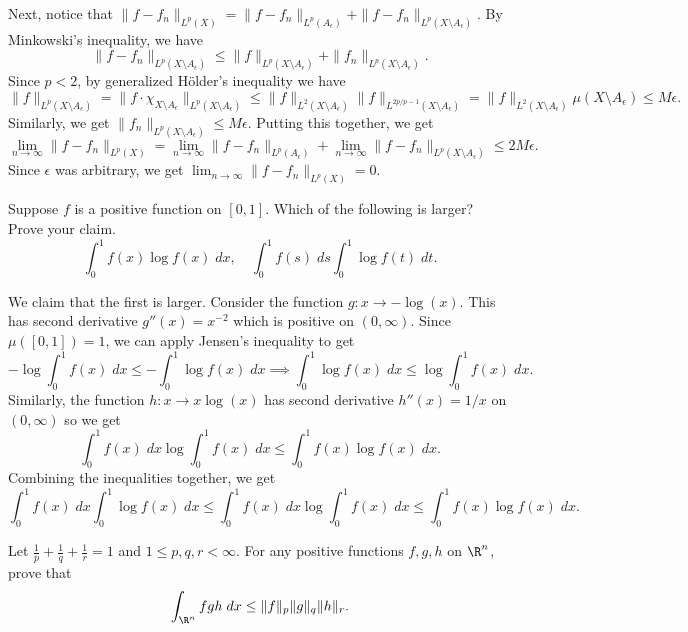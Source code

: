 \documentclass[11pt,letterpaper]{article}
\begin{document}
\begin{solution}
    \quad Next, notice that $\|f-f_n\|_{L^p(X)} = \|f-f_n\|_{L^p(A_\epsilon)} + \|f-f_n\|_{L^p(X\setminus A_\epsilon)}$. By Minkowski's inequality, we have
    \[
        \|f-f_n\|_{L^p(X\setminus A_\epsilon)} \leq \|f\|_{L^p(X\setminus A_\epsilon)}+\|f_n\|_{L^p(X\setminus A_\epsilon)}
    .\] 
    Since $p<2$, by generalized H\"older's inequality we have
    \[
        \|f\|_{L^p(X\setminus A_\epsilon)} = \|f\cdot \chi_{X\setminus A_\epsilon}\|_{L^p(X\setminus A_\epsilon)} \leq \|f\|_{L^2(X\setminus A_\epsilon)}\|f\|_{L^{2p / p-1}(X\setminus A_\epsilon)} = \|f\|_{L^2(X\setminus A_\epsilon)} \mu(X\setminus A_\epsilon) \leq M\epsilon
    .\] 
    Similarly, we get $\|f_n\|_{L^p(X\setminus A_\epsilon)}\leq M\epsilon$. Putting this together, we get
    \[
        \lim_{n\to \infty}\|f-f_n\|_{L^p(X)} = \lim_{n\to \infty}\|f-f_n\|_{L^p(A_\epsilon)}+\lim_{n\to \infty}\|f-f_n\|_{L^p(X\setminus A_\epsilon)} \leq 2M\epsilon
    .\]  
    Since $\epsilon$ was arbitrary, we get $\lim_{n\to \infty}\|f-f_n\|_{L^p(X)}=0$.
\end{solution}

\begin{problem}
    Suppose $f$ is a positive function on $[0,1]$. Which of the following is larger? Prove your claim.
    \[
        \int^1_0 f(x)\log f(x)\;dx,\quad \int^1_0 f(s)\;ds \int^1_0 \log f(t)\;dt
    .\] 
\end{problem}

\begin{solution}
    \quad We claim that the first is larger. Consider the function $g : x \to -\log(x)$. This has second derivative $g''(x) = x^{-2}$ which is positive on $(0, \infty)$. Since $\mu([0,1])=1$, we can apply Jensen's inequality to get
    \[
        -\log\int_0^1 f(x)\;dx \leq -\int_0^1 \log f(x)\;dx \implies \int_0^1 \log f(x)\;dx \leq \log \int_0^1 f(x)\;dx
    .\]
    Similarly, the function $h : x \to x\log(x)$ has second derivative $h''(x) = 1 /x$ on $(0,\infty)$ so we get
    \[
        \int_0^1 f(x)\;dx \log \int_0^1 f(x)\;dx \leq \int_0^1 f(x)\log f(x)\;dx 
    .\]  
    Combining the inequalities together, we get
    \[
        \int_0^1 f(x)\;dx \int_0^1 \log f(x)\;dx \leq \int_0^1 f(x)\;dx\log\int_0^1 f(x)\;dx \leq \int_0^1 f(x)\log f(x)\;dx
    .\] 
\end{solution}

\begin{problem}
    Let $\frac{1}{p}+\frac{1}{q}+\frac{1}{r}=1$ and $1\leq p,q,r<\infty$. For any positive functions $f,g,h$ on $\R^n$, prove that
    \[
        \int_{\R^n} fgh\; dx\leq \|f\|_p\|g\|_q\|h\|_r
    .\]  
\end{problem}
\end{document}
